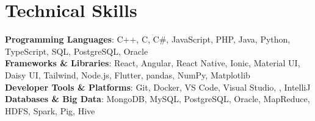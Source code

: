 \documentclass[letterpaper,11pt]{article}
\begin{document}
\section{Technical Skills}
\begin{itemize}[leftmargin=0.15in, label={}]
  \small{\item{
    \textbf{Programming Languages}{: C++, C, C\#, JavaScript, PHP, Java, Python, TypeScript, SQL, PostgreSQL, Oracle} \\
    \textbf{Frameworks \& Libraries}{: React, Angular, React Native, Ionic, Material UI, Daisy UI, Tailwind, Node.js, Flutter, pandas, NumPy, Matplotlib} \\
    \textbf{Developer Tools \& Platforms}{: Git, Docker, VS Code, Visual Studio, , IntelliJ} \\
    \textbf{Databases \& Big Data}{: MongoDB, MySQL, PostgreSQL, Oracle, MapReduce, HDFS, Spark, Pig, Hive}
  }}
\end{itemize}

\end{document}
